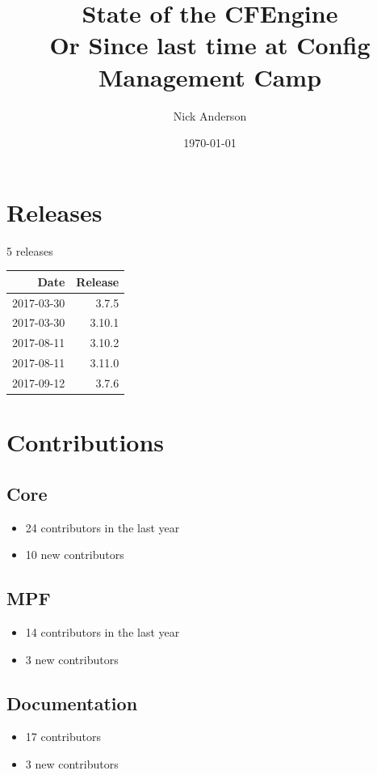 \documentclass[11pt]{article}
\author{Nick Anderson}
\date{\today}
\title{State of the CFEngine\\\medskip
\large Or Since last time at Config Management Camp}
\begin{document}
\maketitle

\section*{Releases}
\label{sec:org5d45ecc}
5 releases


\begin{center}
\begin{tabular}{rr}
Date & Release\\
\hline
2017-03-30 & 3.7.5\\
2017-03-30 & 3.10.1\\
2017-08-11 & 3.10.2\\
2017-08-11 & 3.11.0\\
2017-09-12 & 3.7.6\\
\end{tabular}
\end{center}
\section*{Contributions}
\label{sec:org2937a57}
\subsection*{Core}
\label{sec:org9a8fdeb}
\begin{itemize}
\item 24 contributors in the last year
\end{itemize}
\begin{itemize}
\item 10 new contributors
\end{itemize}

\subsection*{MPF}
\label{sec:orgefd0575}
\begin{itemize}
\item 14 contributors in the last year
\end{itemize}
\begin{itemize}
\item 3 new contributors
\end{itemize}

\subsection*{Documentation}
\label{sec:org243b638}
\begin{itemize}
\item 17 contributors
\item 3 new contributors
\end{itemize}
\end{document}
